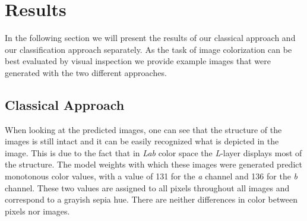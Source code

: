 \documentclass[12pt,letterpaper]{article}
\begin{document}
\section{Results}
In the following section we will present the results of our classical approach and our classification approach separately. As the task of image colorization can be best evaluated by visual inspection we provide example images that were generated with the two different approaches.\\

\subsection{Classical Approach}
When looking at the predicted images, one can see that the structure of the images is still intact and it can be easily recognized what is depicted in the image. This is due to the fact that in \emph{Lab} color space the \emph{L}-layer displays most of the structure. The model weights with which these images were generated predict monotonous color values, with a value of 131 for the \emph{a} channel and 136 for the \emph{b} channel. These two values are assigned to all pixels throughout all images and correspond to a grayish sepia hue. There are neither differences in color between pixels nor images.
\newpage
\end{document}
